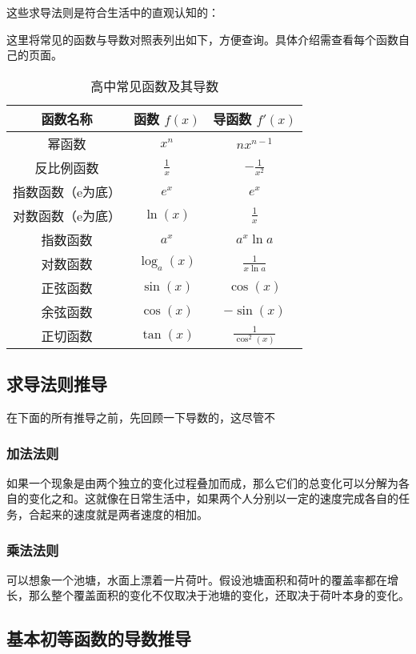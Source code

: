 这些求导法则是符合生活中的直观认知的：


这里将常见的函数与导数对照表列出如下，方便查询。具体介绍需查看每个函数自己的页面。

\begin{table}[ht]
\centering
\caption{高中常见函数及其导数}\label{tab_HsDerv1}
\begin{tabular}{|c|c|c|}
\hline
\textbf{函数名称}     & \textbf{函数 $f(x)$}     & \textbf{导函数 $f'(x)$}     \\ \hline
幂函数&$x^n$                    & $n x^{n-1}$                \\ \hline
反比例函数&$\displaystyle\frac{1}{x}$             & $\displaystyle-\frac{1}{x^2}$           \\ \hline
指数函数（e为底）&$e^x$                     & $e^x$                      \\ \hline
对数函数（e为底）&$\ln(x)$                  & $\displaystyle\frac{1}{x}$              \\ \hline
指数函数&$a^x$                     & $a^x\ln a $                      \\ \hline
对数函数&$\log_a(x)$                  & $\displaystyle \frac{1}{x\ln a}$              \\ \hline
正弦函数&$\sin(x)$                 & $\cos(x)$                  \\ \hline
余弦函数&$\cos(x)$                 & $-\sin(x)$                 \\ \hline
正切函数&$\tan(x)$                 & $\displaystyle \frac{1}{\cos^2(x)}$                \\ \hline
\end{tabular}
\end{table}

\subsection{求导法则推导}

在下面的所有推导之前，先回顾一下导数的，这尽管不


\subsubsection{加法法则}
如果一个现象是由两个独立的变化过程叠加而成，那么它们的总变化可以分解为各自的变化之和。这就像在日常生活中，如果两个人分别以一定的速度完成各自的任务，合起来的速度就是两者速度的相加。

\subsubsection{乘法法则}
可以想象一个池塘，水面上漂着一片荷叶。假设池塘面积和荷叶的覆盖率都在增长，那么整个覆盖面积的变化不仅取决于池塘的变化，还取决于荷叶本身的变化。

\subsection{基本初等函数的导数推导}

